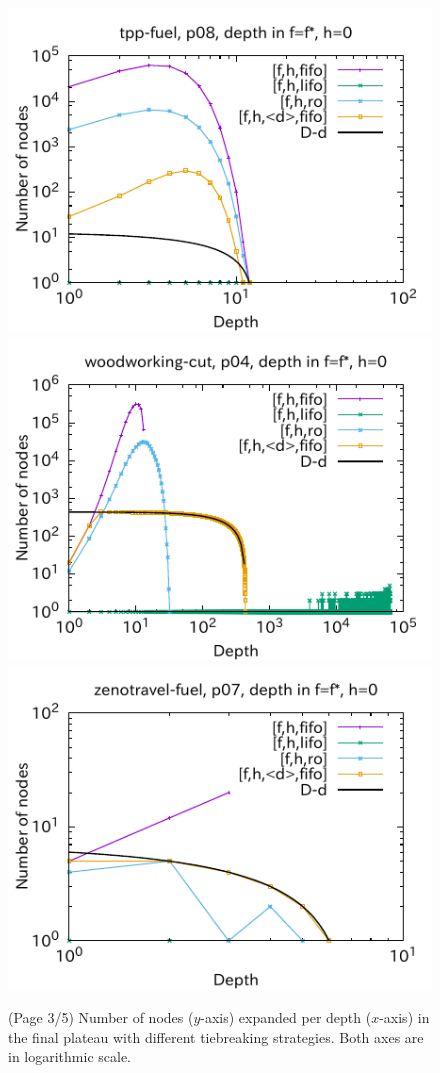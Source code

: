 \begin{figure}[htbp]
\includegraphics{img/output-lmcut/tpp-fuel/p08-0.pdf}
\includegraphics{img/output-lmcut/woodworking-cut/p04-0.pdf}
\includegraphics{img/output-lmcut/zenotravel-fuel/p07-0.pdf}
 \caption{(Page 3/5) Number of nodes ($y$-axis) expanded per depth ($x$-axis) in
 the final plateau with different tiebreaking strategies. Both axes are in logarithmic scale.
 }
 \label{fig:depth-histogram3}
\end{figure}

